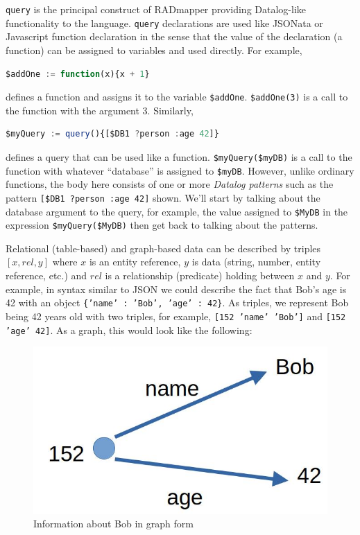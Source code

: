 \documentclass[9pt,letterpaper]{article}
\newcommand{\stt}[1]{\texttt{#1}} %
\begin{document}
\stt{query} is the principal construct of RADmapper providing Datalog-like functionality to the language.
\stt{query} declarations are used like JSONata or Javascript function declaration in the sense that the value of the declaration (a function) can be assigned to variables and used directly.
For example,
\begin{lstlisting}[language=JavaScript,numbers=none,basicstyle=\ttfamily\scriptsize]
$addOne := function(x){x + 1}
\end{lstlisting} \vspace{-2em}
defines a function and assigns it to the variable \stt{\$addOne}.
\stt{\$addOne(3)} is a call to the function with the argument 3.
Similarly,
\begin{lstlisting}[language=JavaScript,numbers=none,basicstyle=\ttfamily\scriptsize]
$myQuery := query(){[$DB1 ?person :age 42]}
\end{lstlisting} \vspace{-2em}
defines a query that can be used like a function.
\stt{\$myQuery(\$myDB)} is a call to the function with whatever ``database'' is assigned to \stt{\$myDB}.
However, unlike ordinary functions, the body here consists of one or more \textit{Datalog patterns} such as the pattern \stt{[\$DB1 ?person :age 42]} shown.
We'll start by talking about the database argument to the query, for example, the value assigned to \stt{\$MyDB} in the expression \stt{\$myQuery(\$MyDB)} then get back to talking about the patterns.

Relational (table-based) and graph-based data can be described by triples $[x,rel,y]$ where $x$ is an entity reference, $y$ is data (string, number, entity reference, etc.) and $rel$ is a relationship (predicate) holding between $x$ and $y$.
For example, in syntax similar to JSON we could describe the fact that Bob's age is 42 with an object \stt{\{'name' : 'Bob', 'age' : 42\}}.
As triples, we represent Bob being 42 years old with two triples, for example, \stt{[152 'name' 'Bob']} and \stt{[152 'age' 42]}.
As a graph, this would look like the following:

\begin{figure}[H]
  \caption{Information about Bob in graph form}
  \label{fig:bob-as-a-graph}
     \includegraphics[scale=0.15]{bob-age-42.jpg}
  \centering
\end{figure}
\end{document}
